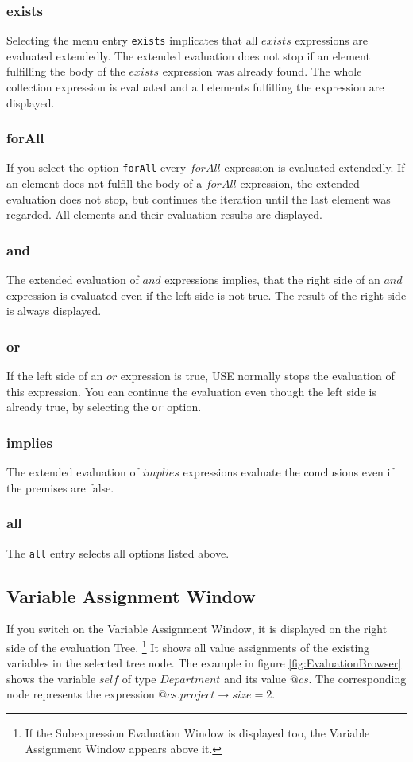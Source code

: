 \documentclass[a4paper,titlepage,oneside,final]{scrreprt} %
\begin{document}
\subsubsection{exists}
Selecting the menu entry \verb+exists+ implicates that all $\mathit{exists}$ expressions
are evaluated extendedly. The extended evaluation does not stop if an element
fulfilling the body of the $\mathit{exists}$ expression was already found. The whole collection expression is
evaluated and all elements fulfilling the expression are displayed.
\subsubsection{forAll}
If you select the option \verb+forAll+ every $\mathit{forAll}$ expression is evaluated extendedly.
If an element does not fulfill the body of a $\mathit{forAll}$ expression, the extended evaluation does not stop, but
continues the iteration until the last element was regarded. All elements and their evaluation results are displayed.
\subsubsection{and}
The extended evaluation of $\mathit{and}$ expressions implies, that the right side
of an $\mathit{and}$ expression is evaluated even if the left side is not true.
The result of the right side is always displayed.
\subsubsection{or}
If the left side of an $\mathit{or}$ expression is true, USE normally stops the evaluation of
this expression. You can continue the evaluation even though the left side is already true, by
selecting the \verb+or+ option.
\subsubsection{implies}
The extended evaluation of $\mathit{implies}$ expressions evaluate the
conclusions even if the premises are false.
\subsubsection{all}
The \verb+all+ entry selects all options listed above.
\subsection{Variable Assignment Window}\label{variableAssignmentWindow}
If you switch on the Variable Assignment Window, it is displayed on the right side
of the evaluation Tree. \footnote{If the Subexpression Evaluation Window
is displayed too, the Variable Assignment Window appears above it.}
It shows all value assignments of the existing variables in the selected tree node.
The example in figure \ref{fig:EvaluationBrowser} shows the variable $\mathit{self}$ of type
$\mathit{Department}$ and its value $\mathit{@cs}$. The corresponding node
represents the expression $\mathit{@cs}.\mathit{project}\rightarrow\mathit{size}=2$.
\end{document}
